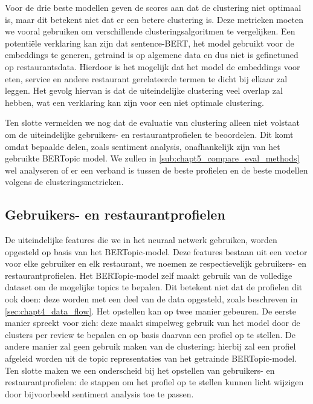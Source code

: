 Voor de drie beste modellen geven de scores aan dat de clustering niet optimaal is, maar dit betekent niet dat er een betere clustering is. Deze metrieken moeten we vooral gebruiken om verschillende clusteringsalgoritmen te vergelijken. Een potentiële verklaring kan zijn dat sentence-BERT, het model gebruikt voor de embeddings te generen, getraind is op algemene data en dus niet is gefinetuned op restaurantsdata. Hierdoor is het mogelijk dat het model de embeddings voor eten, service en andere restaurant gerelateerde termen te dicht bij elkaar zal leggen. Het gevolg hiervan is dat de uiteindelijke clustering veel overlap zal hebben, wat een verklaring kan zijn voor een niet optimale clustering.

Ten slotte vermelden we nog dat de evaluatie van clustering alleen niet volstaat om de uiteindelijke gebruikers- en restaurantprofielen te beoordelen. Dit komt omdat bepaalde delen, zoals sentiment analysis, onafhankelijk zijn van het gebruikte BERTopic model. We zullen in \autoref{sub:chapt5_compare_eval_methods} wel analyseren of er een verband is tussen de beste profielen en de beste modellen volgens de clusteringsmetrieken.


\subsection{Gebruikers- en restaurantprofielen}
\label{sec:chapt4_nlp_profielen}
De uiteindelijke features die we in het neuraal netwerk gebruiken, worden opgesteld op basis van het BERTopic-model. Deze features bestaan uit een vector voor elke gebruiker en elk restaurant, we noemen ze respectievelijk gebruikers- en restaurantprofielen. Het BERTopic-model zelf maakt gebruik van de volledige dataset om de mogelijke topics te bepalen. Dit betekent niet dat de profielen dit ook doen: deze worden met een deel van de data opgesteld, zoals beschreven in \autoref{sec:chapt4_data_flow}.\newline
Het opstellen kan op twee manier gebeuren. De eerste manier spreekt voor zich: deze maakt simpelweg gebruik van het model door de clusters per review te bepalen en op basis daarvan een profiel op te stellen. De andere manier zal geen gebruik maken van de clustering: hierbij zal een profiel afgeleid worden uit de topic representaties van het getrainde BERTopic-model. Ten slotte maken we een onderscheid bij het opstellen van gebruikers- en restaurantprofielen: de stappen om het profiel op te stellen kunnen licht wijzigen door bijvoorbeeld sentiment analysis toe te passen.

